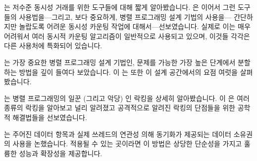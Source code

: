 는 저수준 동시성 거래를 위한 도구들에 대해 짧게 알아봤습니다.
 은 이어서 그런 도구들의 사용법을---그리고, 보다 중요하게,
병렬 프로그래밍 설계 기법의 사용을--- 간단하지만 놀랍도록 어려운 동시성 카운팅
작업에 대해서---선보였습니다.
실제로 이는 매우 어려워서 여러 동시적 카운팅 알고리즘이 일반적으로 사용되고
있으며, 이것들 각각은 다른 사용처에 특화되어 있습니다.

 는 가장 중요한 병렬
프로그래밍 설계 기법인, 문제를 가능한 가장 높은 단계에서 분할하는 방법을 깊이
들여다 보았습니다.
이  는 또한 이 설계
공간에서의 요점 여럿을 살펴봤습니다.

 는 병렬 프로그래밍의 일꾼 (그리고 악당) 인 락킹을 상세히
알아봤습니다.
이  은 여러 종류의 락킹을 알아보고 널리 알려졌고
공격적으로 알려진 락킹의 단점들을 위한 공학적 해결법들을 선보였습니다.

 는 주어진 데이터 항목과 실제 쓰레드의 연관성 의해
동기화가 제공되는 데이터 소유권의 사용을 논했습니다.
적용될 수 있는 곳이라면 이 방법은 상당한 단순성을 가지고 훌륭한 성능과 확장성을
제공합니다.

\iffalse

